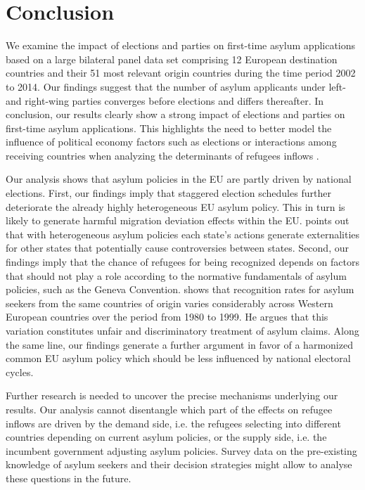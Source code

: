 \documentclass[a4paper,12pt]{article}
\begin{document}
\section{Conclusion}\label{sec:conclusion}

We examine the impact of elections and parties on first-time asylum applications based on a large bilateral panel data set comprising 12 European destination countries and their 51 most relevant origin countries during the time period 2002 to 2014. Our findings suggest that  the number of asylum applicants under left- and right-wing parties converges before elections and differs thereafter. In conclusion, our results clearly show a strong impact of elections and parties on first-time asylum applications. This highlights the need to better model the influence of political economy factors such as elections or interactions among receiving countries when analyzing the determinants of refugees inflows \citep{gorlach2017}. 

Our analysis shows that asylum policies in the EU are partly driven by national elections. First, our findings imply that staggered election schedules further deteriorate the already highly heterogeneous EU asylum policy. This in turn is likely to generate harmful migration deviation effects within the EU. \citet{thielemann2006} points out that with heterogeneous asylum policies each state's actions generate externalities for other states that potentially cause controversies between states. Second, our findings imply that the chance of refugees for being recognized depends on factors that should not play a role according to the normative fundamentals of asylum policies, such as the Geneva Convention. \citet{neumayer2005} shows that recognition rates for asylum seekers from the same countries of origin varies considerably across Western European countries over the period from 1980 to 1999. He argues that this variation constitutes unfair and discriminatory treatment of asylum claims. Along the same line, our findings generate a further argument in favor of a harmonized common EU asylum policy which should be less influenced by national electoral cycles. 

Further research is needed to uncover the precise mechanisms underlying our results. Our analysis cannot disentangle which part of the effects on refugee inflows are driven by the demand side, i.e. the refugees selecting into different countries depending on current asylum policies, or the supply side, i.e. the incumbent government adjusting asylum policies.  Survey data on the pre-existing knowledge of asylum seekers and their decision strategies might allow to analyse these questions in the future. 
 
\end{document}
